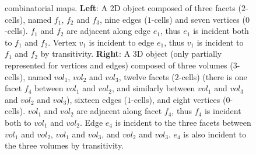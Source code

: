 \begin{figure}[ht]
{      combinatorial maps.  \textbf{Left}: A 2D object composed of
      three facets ($2$-cells), named $f_1$, $f_2$ and $f_3$, nine
      edges ($1$-cells) and seven vertices ($0$-cells).  $f_1$ and
      $f_2$ are adjacent along edge $e_1$, thus $e_1$ is incident both
      to $f_1$ and $f_2$. Vertex $v_1$ is incident to edge $e_1$, thus
      $v_1$ is incident to $f_1$ and $f_2$ by transitivity.
      \textbf{Right}: A 3D object (only partially represented for vertices and edges)
      composed of three volumes ($3$-cells), named $vol_1$, $vol_2$
      and $vol_3$, twelve facets ($2$-cells) (there is one facet
      $f_4$ between $vol_1$ and $vol_2$, and similarly between $vol_1$
      and $vol_3$ and $vol_2$ and $vol_3$), sixteen edges ($1$-cells),
      and eight vertices ($0$-cells). $vol_1$ and $vol_2$ are adjacent
      along facet $f_4$, thus $f_4$ is incident both to $vol_1$ and
      $vol_2$. Edge $e_4$ is incident to the three facets between
      $vol_1$ and $vol_2$, $vol_1$ and $vol_3$, and $vol_2$ and
      $vol_3$.  $e_4$ is also incident to the three volumes by
      transitivity.}
    \label{fig-exemple-3Dmanifold}
\end{figure}

